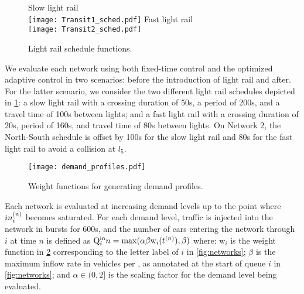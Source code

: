 \begin{figure}[t!]
\centering
\scriptsize{Slow light rail}\\
\texttt{[image: Transit1\_sched.pdf]}
\scriptsize{Fast light rail}\\
\texttt{[image: Transit2\_sched.pdf]}
\caption{Light rail schedule functions.}
\label{fig:transits}
\end{figure}



We evaluate each network using both fixed-time control and the optimized
adaptive control in two scenarios: before the introduction of light rail and
after.
%
For the latter scenario, we consider the two different light rail schedules
depicted in \cref{fig:transits}:
%
a slow light rail with a crossing duration of 50s, a period of 200s, and a
travel time of 100s between lights;
%
and a fast light rail with a crossing duration of 20s, period of 160s, and
travel time of 80s between lights.
%
On Network 2, the North-South schedule is offset by 100s for the slow light rail
and 80s for the fast light rail to avoid a collision at $l_5$.



\begin{figure}[t]
\centering
\texttt{[image: demand\_profiles.pdf]}
\caption{Weight functions for generating demand profiles.}
\label{fig:demand_profiles}
\end{figure}


%
%
Each network is evaluated at increasing demand levels up to the point where
$\inq{i}$ becomes saturated.
%
%
For each demand level, traffic is injected into the network in bursts for 600s,
and the number of cars entering the network through $i$ at time $n$ is defined
as $\QIN{i}{n} = \mathrm{max}(\alpha \beta \mathrm{w}_i(\tn[n]),\beta)$ where:
%
$\mathrm{w}_i$ is the weight function in \cref{fig:demand_profiles}
corresponding to the letter label of $i$ in \cref{fig:networks};
%
$\beta$ is the maximum inflow rate in vehicles per \DT, as annotated at the
start of queue $i$ in \cref{fig:networks}; and
%
$\alpha \in (0,2]$ is the scaling factor for the demand level being evaluated.


